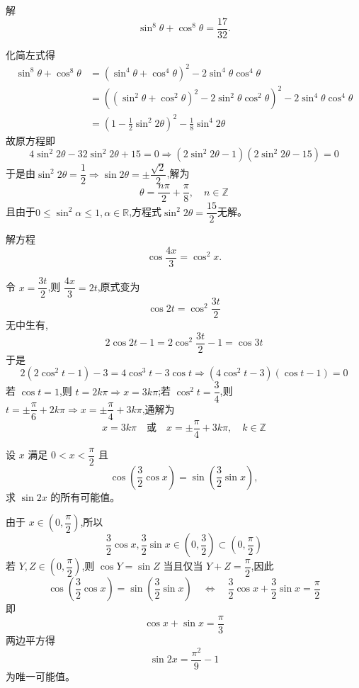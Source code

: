 \begin{questions}
    \question 解 
    \[
    \sin^{8}\theta + \cos^{8}\theta = \frac{17}{32}.
    \] 
    \begin{solution}
        化简左式得
        \begin{align*}
        \sin^8 \theta + \cos^8 \theta
        &=(\sin^4 \theta + \cos^4 \theta)^2 - 2 \sin^4 \theta \cos^4 \theta \\
        &=\left((\sin^2 \theta + \cos^2 \theta)^2 - 2 \sin^2 \theta \cos^2 \theta\right)^2 - 2 \sin^4 \theta \cos^4 \theta \\
        &=\left(1 - \frac{1}{2} \sin^2 2\theta\right)^2 - \frac{1}{8} \sin^4 2\theta 
        \end{align*}
        故原方程即
        \[
        4 \sin^2 2\theta - 32 \sin^2 2\theta + 15 = 0 \Rightarrow (2 \sin^2 2\theta - 1)(2 \sin^2 2\theta - 15) = 0
        \]
        于是由$\sin^2 2\theta = \dfrac{1}{2} \Rightarrow \sin 2\theta = \pm \dfrac{\sqrt{2}}{2}$,解为
        \[
        \theta = \frac{n\pi}{2} + \frac{\pi}{8}, \quad n \in \mathbb{Z}
        \]
        且由于$0 \leq \sin^2 \alpha \leq 1, \alpha \in \mathbb{R}$,方程式$\sin^2 2\theta = \dfrac{15}{2}$无解。
    \end{solution}

    \question 解方程  
    \[
    \cos\frac{4x}{3}=\cos^{2}x.
    \]
    \begin{solution}
        令 \(x = \dfrac{3t}{2}\),则 \(\dfrac{4x}{3} = 2t\),原式变为
        \[
        \cos2t = \cos^2\frac{3t}{2}
        \]
        无中生有,
        \[
        2\cos2t - 1 = 2\cos^2\frac{3t}{2} - 1 = \cos3t
        \]
        于是
        \[
        2(2\cos^2t-1) - 3 = 4\cos^3 t - 3\cos t
        \Rightarrow (4\cos^2 t - 3)(\cos t - 1) = 0
        \]
        若 \(\cos t = 1\),则 \(t = 2k\pi \Rightarrow x  = 3k\pi\);若 \(\cos^2 t = \dfrac{3}{4}\),则$t = \pm \dfrac{\pi}{6} + 2k\pi \Rightarrow x = \pm\dfrac{\pi}{4} + 3k\pi $,通解为
        \[
        x = 3k\pi \quad \text{或} \quad x = \pm\dfrac{\pi}{4} + 3k\pi,\quad k \in \mathbb{Z}
        \]
    \end{solution}

    \question 设 $x$ 满足 $0 < x < \dfrac{\pi}{2}$ 且 
    \[
    \cos \left(\frac{3}{2} \cos x\right) = \sin \left(\frac{3}{2} \sin x\right),
    \]
    求 $\sin 2x$ 的所有可能值。
    \begin{solution}
        由于 $x \in \left(0,\dfrac{\pi}{2}\right)$,所以 
        \[
        \frac{3}{2}\cos x,\frac{3}{2}\sin x \in \left(0,\frac{3}{2}\right) \subset \left(0,\frac{\pi}{2}\right)
        \]
        若 $Y,Z \in \left(0,\dfrac{\pi}{2}\right)$,则 $\cos Y = \sin Z$ 当且仅当 $Y+Z=\dfrac{\pi}{2}$,因此
        \[
        \cos\left(\frac{3}{2}\cos x\right) = \sin\left(\frac{3}{2}\sin x\right)
        \quad \Longleftrightarrow \quad
        \frac{3}{2}\cos x + \frac{3}{2}\sin x = \frac{\pi}{2}
        \]
        即
        \[
        \cos x + \sin x = \frac{\pi}{3}
        \]
        两边平方得
        \[
        \sin 2x = \frac{\pi^2}{9} - 1
        \]
        为唯一可能值。
    \end{solution}
    

\end{questions}
